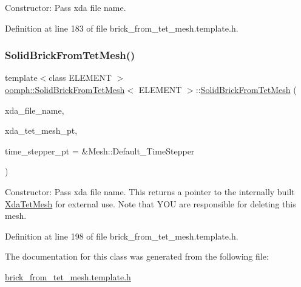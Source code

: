 Constructor\+: Pass xda file name. 



Definition at line 183 of file brick\+\_\+from\+\_\+tet\+\_\+mesh.\+template.\+h.

\mbox{\label{classoomph_1_1SolidBrickFromTetMesh_a6d45c13e6c02bb636b23e72d32240619}} 
\subsubsection{\texorpdfstring{Solid\+Brick\+From\+Tet\+Mesh()}{SolidBrickFromTetMesh()}\hspace{0.1cm}{\footnotesize\ttfamily [2/2]}}
{\footnotesize\ttfamily template$<$class E\+L\+E\+M\+E\+NT $>$ \\
\hyperlink{classoomph_1_1SolidBrickFromTetMesh}{oomph\+::\+Solid\+Brick\+From\+Tet\+Mesh}$<$ E\+L\+E\+M\+E\+NT $>$\+::\hyperlink{classoomph_1_1SolidBrickFromTetMesh}{Solid\+Brick\+From\+Tet\+Mesh} (\begin{DoxyParamCaption}\item[{const std\+::string}]{xda\+\_\+file\+\_\+name,  }\item[{\hyperlink{classoomph_1_1XdaTetMesh}{Xda\+Tet\+Mesh}$<$ T\+Element$<$ 3, 3 $>$ $>$ $\ast$\&}]{xda\+\_\+tet\+\_\+mesh\+\_\+pt,  }\item[{Time\+Stepper $\ast$}]{time\+\_\+stepper\+\_\+pt = {\ttfamily \&Mesh\+:\+:Default\+\_\+TimeStepper} }\end{DoxyParamCaption})\hspace{0.3cm}{\ttfamily [inline]}}



Constructor\+: Pass xda file name. This returns a pointer to the internally built \hyperlink{classoomph_1_1XdaTetMesh}{Xda\+Tet\+Mesh} for external use. Note that Y\+OU are responsible for deleting this mesh. 



Definition at line 198 of file brick\+\_\+from\+\_\+tet\+\_\+mesh.\+template.\+h.



The documentation for this class was generated from the following file\+:\begin{DoxyCompactItemize}
\item 
\hyperlink{brick__from__tet__mesh_8template_8h}{brick\+\_\+from\+\_\+tet\+\_\+mesh.\+template.\+h}\end{DoxyCompactItemize}
